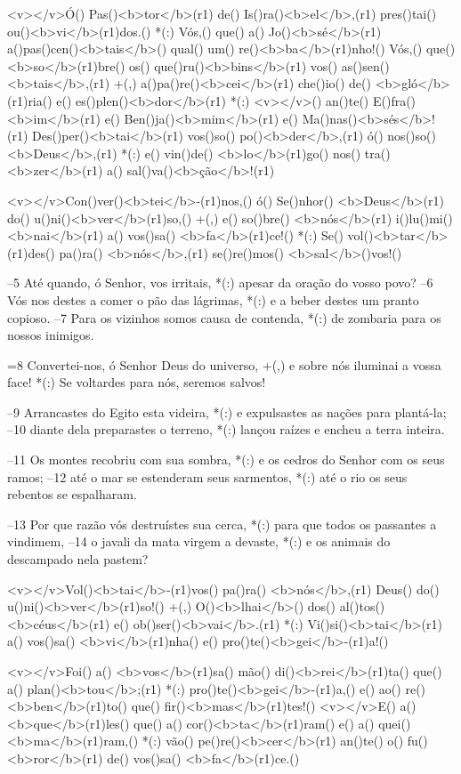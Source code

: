 <v></v>Ó() Pas()<b>tor</b>(r1) de() Is()ra()<b>el</b>,(r1) pres()tai() ou()<b>vi</b>(r1)dos.() *(:)
Vós,() que() a() Jo()<b>sé</b>(r1) a()pas()cen()<b>tais</b>() qual() um() re()<b>ba</b>(r1)nho!()
Vós,() que() <b>so</b>(r1)bre() os() que()ru()<b>bins</b>(r1) vos() as()sen()<b>tais</b>,(r1) +(,)
a()pa()re()<b>cei</b>(r1) che()io() de() <b>gló</b>(r1)ria() e() es()plen()<b>dor</b>(r1) *(:)
<v></v>() an()te() E()fra()<b>im</b>(r1) e() Ben()ja()<b>mim</b>(r1) e() Ma()nas()<b>sés</b>!(r1)
Des()per()<b>tai</b>(r1) vos()so() po()<b>der</b>,(r1) ó() nos()so() <b>Deus</b>,(r1) *(:)
e() vin()de() <b>lo</b>(r1)go() nos() tra()<b>zer</b>(r1) a() sal()va()<b>ção</b>!(r1)

<v></v>Con()ver()<b>tei</b>-(r1)nos,() ó() Se()nhor() <b>Deus</b>(r1) do() u()ni()<b>ver</b>(r1)so,() +(,)
e() so()bre() <b>nós</b>(r1) i()lu()mi()<b>nai</b>(r1) a() vos()sa() <b>fa</b>(r1)ce!() *(:)
Se() vol()<b>tar</b>(r1)des() pa()ra() <b>nós</b>,(r1) se()re()mos() <b>sal</b>()vos!()

–5 Até quando, ó Senhor, vos irritais, *(:)
apesar da oração do vosso povo?
–6 Vós nos destes a comer o pão das lágrimas, *(:)
e a beber destes um pranto copioso.
–7 Para os vizinhos somos causa de contenda, *(:)
de zombaria para os nossos inimigos.

=8 Convertei-nos, ó Senhor Deus do universo, +(,)
e sobre nós iluminai a vossa face! *(:)
Se voltardes para nós, seremos salvos!

–9 Arrancastes do Egito esta videira, *(:)
e expulsastes as nações para plantá-la;
–10 diante dela preparastes o terreno, *(:)
lançou raízes e encheu a terra inteira.

–11 Os montes recobriu com sua sombra, *(:)
e os cedros do Senhor com os seus ramos;
–12 até o mar se estenderam seus sarmentos, *(:)
até o rio os seus rebentos se espalharam.

–13 Por que razão vós destruístes sua cerca, *(:)
para que todos os passantes a vindimem,
–14 o javali da mata virgem a devaste, *(:)
e os animais do descampado nela pastem?

<v></v>Vol()<b>tai</b>-(r1)vos() pa()ra() <b>nós</b>,(r1) Deus() do() u()ni()<b>ver</b>(r1)so!() +(,)
O()<b>lhai</b>() dos() al()tos() <b>céus</b>(r1) e() ob()ser()<b>vai</b>.(r1) *(:)
Vi()si()<b>tai</b>(r1) a() vos()sa() <b>vi</b>(r1)nha() e() pro()te()<b>gei</b>-(r1)a!()

<v></v>Foi() a() <b>vos</b>(r1)sa() mão() di()<b>rei</b>(r1)ta() que() a() plan()<b>tou</b>;(r1) *(:)
pro()te()<b>gei</b>-(r1)a,() e() ao() re()<b>ben</b>(r1)to() que() fir()<b>mas</b>(r1)tes!()
<v></v>E() a()<b>que</b>(r1)les() que() a() cor()<b>ta</b>(r1)ram() e() a() quei()<b>ma</b>(r1)ram,() *(:)
vão() pe()re()<b>cer</b>(r1) an()te() o() fu()<b>ror</b>(r1) de() vos()sa() <b>fa</b>(r1)ce.()

